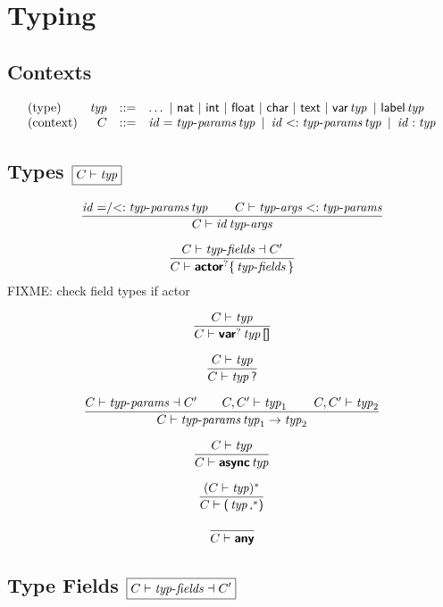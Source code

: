 
\section{Typing}

\subsection*{Contexts}

$$
\begin{array}{@{}lrcl@{}}
\text{(type)} & \x{typ} & ::= &
  \dots ~|~
  \K{nat} ~|~
  \K{int} ~|~
  \K{float} ~|~
  \K{char} ~|~
  \K{text} ~|~
  \K{var} \x{typ} ~|~
  \K{label} \x{typ} \\
\text{(context)} & C & ::= &
  \x{id} = \x{typ-params} \x{typ} ~|~
  \x{id} <: \x{typ-params} \x{typ} ~|~
  \x{id} : \x{typ}
\end{array}
$$


\subsection*{Types \hfill $\boxed{C \vdash \operatorname{\mathit{typ}}}$}

$$
\frac{
  \operatorname{\mathit{id}} \mathrel{{=}/{<:}} \operatorname{\mathit{typ-params}} \operatorname{\mathit{typ}}
  \qquad
  C \vdash \operatorname{\mathit{typ-args}} <: \operatorname{\mathit{typ-params}}
}{
  C \vdash \operatorname{\mathit{id}} \operatorname{\mathit{typ-args}}
}
$$

$$
\frac{
  C \vdash \operatorname{\mathit{typ-fields}} \dashv C'
}{
  C \vdash \textsf{\sf\textbf{actor}}^? \textsf{\sf\{} \operatorname{\mathit{typ-fields}} \textsf{\sf\}}
}
$$
FIXME: check field types if actor

$$
\frac{
  C \vdash \operatorname{\mathit{typ}}
}{
  C \vdash \textsf{\sf\textbf{var}}^? \operatorname{\mathit{typ}} \textsf{\sf[]}
}
$$

$$
\frac{
  C \vdash \operatorname{\mathit{typ}}
}{
  C \vdash \operatorname{\mathit{typ}} \textsf{\sf?}
}
$$

$$
\frac{
  C \vdash \operatorname{\mathit{typ-params}} \dashv C'
  \qquad
  C, C' \vdash \operatorname{\mathit{typ}}_1
  \qquad
  C, C' \vdash \operatorname{\mathit{typ}}_2
}{
  C \vdash \operatorname{\mathit{typ-params}} \operatorname{\mathit{typ}}_1 \rightarrow \operatorname{\mathit{typ}}_2
}
$$

$$
\frac{
  C \vdash \operatorname{\mathit{typ}}
}{
  C \vdash \textsf{\sf\textbf{async}} \operatorname{\mathit{typ}}
}
$$

$$
\frac{
  (C \vdash \operatorname{\mathit{typ}})^\ast
}{
  C \vdash \textsf{\sf(} \operatorname{\mathit{typ}}\textsf{\sf,}^\ast \textsf{\sf)}
}
$$

$$
\frac{
}{
  C \vdash \textsf{\sf\textbf{any}}
}
$$


\subsection*{Type Fields \hfill $\boxed{C \vdash \operatorname{\mathit{typ-fields}} \dashv C'}$}

